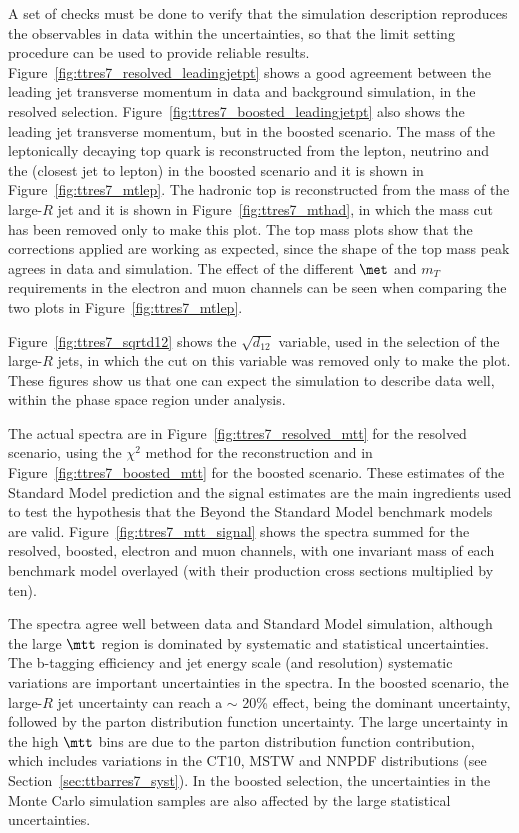 A set of checks must be done to verify that the simulation description
reproduces the observables in data within the uncertainties,
so that the limit setting procedure can be used to provide
reliable results.
Figure~\ref{fig:ttres7_resolved_leadingjetpt} shows a good agreement between the leading jet transverse momentum in data and background simulation, in the resolved selection.
Figure~\ref{fig:ttres7_boosted_leadingjetpt} also shows the leading jet transverse momentum, but in the boosted scenario.
The mass of the leptonically decaying top quark is reconstructed from the lepton, neutrino and the \bjet (closest jet to lepton) in the boosted scenario and it is shown
in Figure~\ref{fig:ttres7_mtlep}. The hadronic top is reconstructed from the mass of the large-$R$ jet and it is shown in Figure~\ref{fig:ttres7_mthad}, in which
the mass cut has been removed only to make this plot.
The top mass plots show that the corrections applied are working
as expected, since the shape of the top mass peak agrees in data and
simulation. The effect of the different $\met$ and $m_T$ requirements
in the electron and muon channels can be seen when comparing
the two plots in Figure~\ref{fig:ttres7_mtlep}.

Figure~\ref{fig:ttres7_sqrtd12} shows the $\sqrt{d_{12}}$ variable, used in the selection of the large-$R$ jets, in
which the cut on this variable was removed only to make the plot.
These figures show us that one can expect the simulation to describe data
well, within the phase space region under analysis.

The actual spectra are in Figure~\ref{fig:ttres7_resolved_mtt} for the resolved scenario, using the $\chi^2$ method for the \mtt reconstruction and
in Figure~\ref{fig:ttres7_boosted_mtt} for the boosted scenario. These estimates of the Standard Model prediction and the signal estimates are the main ingredients used
to test the hypothesis that the Beyond the Standard Model benchmark
models are valid. Figure~\ref{fig:ttres7_mtt_signal} shows the \mtt spectra summed for the resolved, boosted, electron and muon channels,
with one invariant mass of each benchmark model overlayed (with their production cross sections multiplied by ten).

The spectra agree well between data and Standard Model simulation,
although the large $\mtt$ region is dominated by systematic and
statistical uncertainties. The b-tagging efficiency and jet
energy scale (and resolution) systematic variations
are important uncertainties in the
spectra. In the boosted scenario, the large-$R$ jet uncertainty can reach
a $\sim$ 20\% effect, being the dominant uncertainty, followed by the
parton distribution function uncertainty.
The large uncertainty in the high $\mtt$
bins are due to the parton distribution function contribution,
which includes
variations in the CT10, MSTW and NNPDF distributions
(see Section~\ref{sec:ttbarres7_syst}). In the boosted selection,
the uncertainties in the Monte Carlo simulation samples are also affected
by the large statistical uncertainties.


